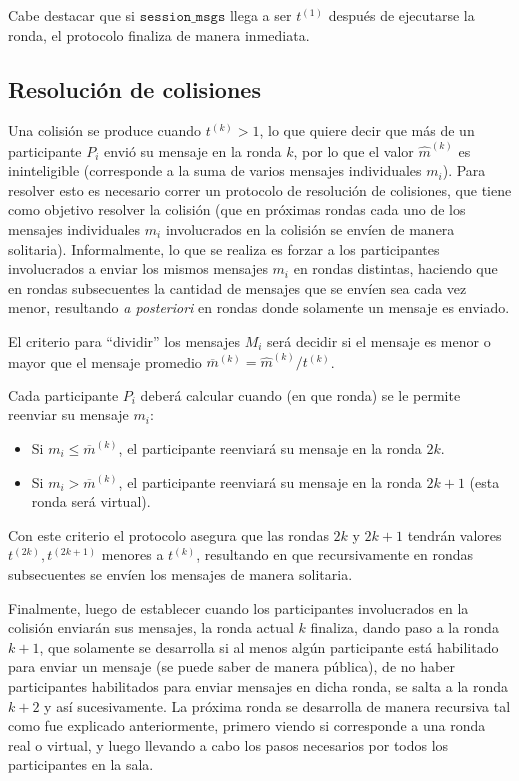 Cabe destacar que si $\mathtt{session\_msgs}$ llega a ser $t^{(1)}$ después de ejecutarse 
la ronda, el protocolo finaliza de manera inmediata.

\subsection{Resolución de colisiones}

Una colisión se produce cuando $t^{(k)} > 1$, lo que quiere decir que más de un 
participante $P_i$ envió su mensaje en la ronda $k$, por lo que el valor $\hat{m}^{(k)}$ 
es ininteligible (corresponde a la suma de varios mensajes individuales $m_i$). Para resolver 
esto es necesario correr un protocolo de resolución de colisiones, que tiene como objetivo 
resolver la colisión (que en próximas rondas cada uno de los mensajes individuales $m_i$ 
involucrados en la colisión se envíen de manera solitaria). Informalmente, lo que se realiza 
es forzar a los participantes involucrados a enviar los mismos mensajes $m_i$ en rondas 
distintas, haciendo que en rondas subsecuentes la cantidad de mensajes que se envíen sea 
cada vez menor, resultando \emph{a posteriori} en rondas donde solamente un mensaje es enviado.

El criterio para ``dividir'' los mensajes $M_i$ será decidir si el mensaje es menor o mayor que 
el mensaje promedio $\overline{m}^{(k)} = \hat{m}^{(k)} / t^{(k)}$.

Cada participante $P_i$ deberá calcular cuando (en que ronda) se le permite reenviar su mensaje $m_i$:
\begin{itemize}
    \item Si $m_i \leq \overline{m}^{(k)}$, el participante reenviará su mensaje en la ronda $2k$.
    \item Si $m_i > \overline{m}^{(k)}$, el participante reenviará su mensaje en la ronda $2k + 1$ 
    (esta ronda será virtual).
\end{itemize}

Con este criterio el protocolo asegura que las rondas $2k$ y $2k + 1$ tendrán valores 
$t^{(2k)}, t^{(2k + 1)}$ menores a $t^{(k)}$, resultando en que recursivamente en rondas 
subsecuentes se envíen los mensajes de manera solitaria.

Finalmente, luego de establecer cuando los participantes involucrados en la colisión enviarán 
sus mensajes, la ronda actual $k$ finaliza, dando paso a la ronda $k+1$, que solamente se 
desarrolla si al menos algún participante está habilitado para enviar un mensaje (se puede 
saber de manera pública), de no haber participantes habilitados para enviar mensajes en dicha 
ronda, se salta a la ronda $k+2$ y así sucesivamente. La próxima ronda se desarrolla de manera 
recursiva tal como fue explicado anteriormente, primero viendo si corresponde a una ronda real 
o virtual, y luego llevando a cabo los pasos necesarios por todos los participantes en la sala.